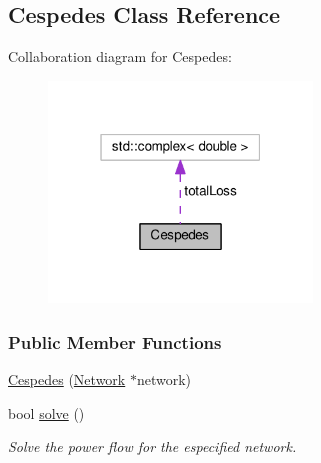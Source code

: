 \hypertarget{class_cespedes}{}\subsection{Cespedes Class Reference}
\label{class_cespedes}


Collaboration diagram for Cespedes\+:
\nopagebreak
\begin{figure}[H]
\begin{center}
\leavevmode
\includegraphics[width=199pt]{class_cespedes__coll__graph}
\end{center}
\end{figure}
\subsubsection*{Public Member Functions}
\begin{DoxyCompactItemize}
\item 
\hyperlink{class_cespedes_ad0b43c0c5ea7935c8dcb4dcf3d79ff7c}{Cespedes} (\hyperlink{class_network}{Network} $\ast$network)
\item 
bool \hyperlink{class_cespedes_a067d624d68effc0eced09b18f2a16fc0}{solve} ()
\begin{DoxyCompactList}\small\item\em Solve the power flow for the especified network. \end{DoxyCompactList}\end{DoxyCompactItemize}
